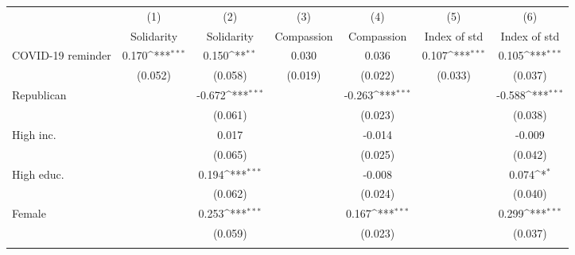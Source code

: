 {
\def\sym#1{\ifmmode^{#1}\else\(^{#1}\)\fi}
\begin{tabular}{l*{6}{c}}
\toprule
                    &\multicolumn{1}{c}{(1)}&\multicolumn{1}{c}{(2)}&\multicolumn{1}{c}{(3)}&\multicolumn{1}{c}{(4)}&\multicolumn{1}{c}{(5)}&\multicolumn{1}{c}{(6)}\\
                    &\multicolumn{1}{c}{Solidarity}&\multicolumn{1}{c}{Solidarity}&\multicolumn{1}{c}{Compassion}&\multicolumn{1}{c}{Compassion}&\multicolumn{1}{c}{Index of std}&\multicolumn{1}{c}{Index of std}\\
\midrule
COVID-19 reminder   &       0.170\sym{***}&       0.150\sym{**} &       0.030         &       0.036         &       0.107\sym{***}&       0.105\sym{***}\\
                    &     (0.052)         &     (0.058)         &     (0.019)         &     (0.022)         &     (0.033)         &     (0.037)         \\
\addlinespace
Republican          &                     &      -0.672\sym{***}&                     &      -0.263\sym{***}&                     &      -0.588\sym{***}\\
                    &                     &     (0.061)         &                     &     (0.023)         &                     &     (0.038)         \\
\addlinespace
High inc.           &                     &       0.017         &                     &      -0.014         &                     &      -0.009         \\
                    &                     &     (0.065)         &                     &     (0.025)         &                     &     (0.042)         \\
\addlinespace
High educ.          &                     &       0.194\sym{***}&                     &      -0.008         &                     &       0.074\sym{*}  \\
                    &                     &     (0.062)         &                     &     (0.024)         &                     &     (0.040)         \\
\addlinespace
Female              &                     &       0.253\sym{***}&                     &       0.167\sym{***}&                     &       0.299\sym{***}\\
                    &                     &     (0.059)         &                     &     (0.023)         &                     &     (0.037)         \\
\addlinespace

\end{tabular}}
